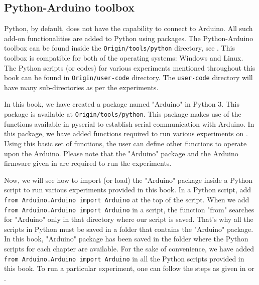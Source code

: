 



\subsection{Python-Arduino toolbox}
\label{sec:python-toolbox}
Python, by default, does not have the capability to connect to Arduino. 
All such add-on functionalities are added to Python using packages. 
The Python-Arduino toolbox can be found inside the {\tt Origin/tools/python} directory, 
see .  This toolbox is compatible for both of the operating systems: Windows and Linux. 
The Python scripts (or codes) for various experiments mentioned throughout this book can be found in 
{\tt Origin/user-code} directory. The {\tt user-code} directory will have many sub-directories as per the experiments. 

In this book, we have created a package named "Arduino" in Python 3.  This package is available at 
{\tt Origin/tools/python}. This package makes use of the functions available in pyserial \cite{pySerial} to 
establish serial communication with Arduino. In this package, we have added functions required to run 
various experiments on \arduino. Using this basic set of functions, the user can define other functions to operate
upon the Arduino. Please note that the "Arduino" package and the Arduino firmware  given 
in  are required to run the experiments. 

Now, we will see how to import (or load) the "Arduino" package inside a Python script to run 
various experiments provided in this book. In a Python script, add {\tt from Arduino.Arduino import Arduino} 
at the top of the script. When we add {\tt from Arduino.Arduino import Arduino} in a script, the function "from" 
searches for "Arduino" only in that directory where our script is saved. That's why all the scripts in Python 
must be saved in a folder that contains the "Arduino" package. In this book, "Arduino" package has been saved 
in the folder where the Python scripts for each chapter are available. For the sake of convenience, we have 
added {\tt from Arduino.Arduino import Arduino} in all the Python scripts provided in this book. 
To run a particular experiment, one can follow the steps as given in  or . 


